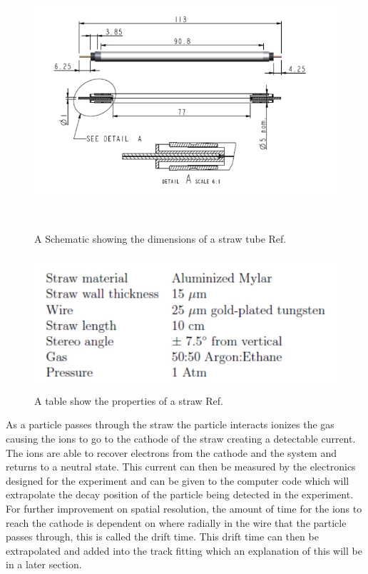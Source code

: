 \documentclass[./Thesis]{subfiles}
\begin{document}
\begin{figure}
	\centerline{\includegraphics[height=95mm]{StrawTube.jpeg}}
	\caption[ Schematic of Straw Tube]{ A Schematic showing the dimensions of a straw tube Ref. \cite{aepps}
	}
	\label{fig:StrawTube}
\end{figure}

\begin{figure}
	\centerline{\includegraphics[height=50mm]{StrawProperties.jpeg}}
	\caption[ Table of Straw Properties]{ A table show the properties of a straw Ref. \cite{aepps}
	}
	\label{fig:StrawProperties}
\end{figure}
	
	
	 As a particle passes through the straw the particle interacts ionizes the gas causing the ions to go to the cathode of the straw creating a detectable current. The ions are able to recover electrons from the cathode and the system and returns to a neutral  state. This current can then be measured by the electronics designed for the experiment and can be given to the computer code which will extrapolate the decay position of the particle being detected in the experiment. For further improvement on spatial resolution, the amount of time for the ions to reach the cathode is dependent on where radially in the wire that the particle passes through, this is called the drift time. This drift time can then be extrapolated and added into the track fitting which an explanation of this will be in a later section.  
	 
\end{document}
